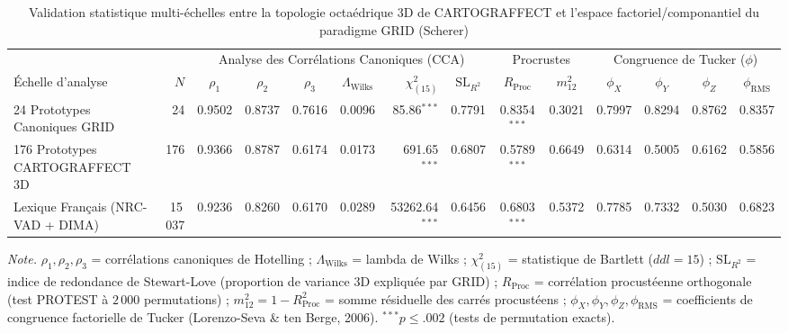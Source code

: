 
\begin{table}[htbp]
\centering
\begin{threeparttable}
\caption{Validation statistique multi-échelles entre la topologie octaédrique 3D de CARTOGRAFFECT et l'espace factoriel/componantiel du paradigme GRID (Scherer)}
\label{tab:cartograffect_grid_multiscale_validation}
\small
\begin{tabular}{l r ccc c r c cc cccc}
\toprule
 & & \multicolumn{6}{c}{Analyse des Corrélations Canoniques (CCA)} & \multicolumn{2}{c}{Procrustes} & \multicolumn{4}{c}{Congruence de Tucker ($\phi$)} \\
\cmidrule(lr){3-8} \cmidrule(lr){9-10} \cmidrule(l){11-14}
Échelle d'analyse & $N$ & $\rho_1$ & $\rho_2$ & $\rho_3$ & $\Lambda_{\text{Wilks}}$ & $\chi^2_{(15)}$ & $\text{SL}_{R^2}$ & $R_{\text{Proc}}$ & $m_{12}^2$ & $\phi_X$ & $\phi_Y$ & $\phi_Z$ & $\phi_{\text{RMS}}$ \\
\midrule
24 Prototypes Canoniques GRID & 24 & 0.9502 & 0.8737 & 0.7616 & 0.0096 & 85.86$^{***}$ & 0.7791 & 0.8354$^{***}$ & 0.3021 & 0.7997 & 0.8294 & 0.8762 & 0.8357 \\
176 Prototypes CARTOGRAFFECT 3D & 176 & 0.9366 & 0.8787 & 0.6174 & 0.0173 & 691.65$^{***}$ & 0.6807 & 0.5789$^{***}$ & 0.6649 & 0.6314 & 0.5005 & 0.6162 & 0.5856 \\
Lexique Français (NRC-VAD + DIMA) & 15\,037 & 0.9236 & 0.8260 & 0.6170 & 0.0289 & 53262.64$^{***}$ & 0.6456 & 0.6803$^{***}$ & 0.5372 & 0.7785 & 0.7332 & 0.5030 & 0.6823 \\
\bottomrule
\end{tabular}
\begin{tablenotes}
\footnotesize
\textit{Note.} $\rho_1, \rho_2, \rho_3$ = corrélations canoniques de Hotelling ; $\Lambda_{\text{Wilks}}$ = lambda de Wilks ; $\chi^2_{(15)}$ = statistique de Bartlett ($ddl = 15$) ; $\text{SL}_{R^2}$ = indice de redondance de Stewart-Love (proportion de variance 3D expliquée par GRID) ; $R_{\text{Proc}}$ = corrélation procustéenne orthogonale (test PROTEST à $2\,000$ permutations) ; $m_{12}^2 = 1 - R_{\text{Proc}}^2$ = somme résiduelle des carrés procustéens ; $\phi_X, \phi_Y, \phi_Z, \phi_{\text{RMS}}$ = coefficients de congruence factorielle de Tucker (Lorenzo-Seva \& ten Berge, 2006). $^{***}p \le .002$ (tests de permutation exacts).
\end{tablenotes}
\end{threeparttable}
\end{table}

